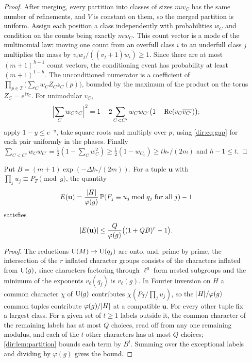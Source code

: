 \begin{proof}
After merging, every partition into classes of sizes $mw_C$ has the same number of refinements,
and $V$ is constant on them, so the merged partition is uniform. Assign each position a class
independently with probabilities $w_C$ and condition on the counts being exactly $mw_C$. This
count vector is a mode of the multinomial law: moving one count from an overfull class $i$ to
an underfull class $j$ multiplies the mass by $v_iw_j/((v_j+1)w_i)\ge1$. Since there are at most
$(m+1)^{h-1}$ count vectors, the conditioning event has probability at least $(m+1)^{1-h}$. The
unconditioned numerator is a coefficient of $\prod_{p\in T}\bigl(\sum_Cw_CZ_Cz_C(p)\bigr)$, bounded
by the maximum of the product on the torus $Z_C=e^{i\tau_C}$. For unimodular $v_C$,
\[
 \Bigl|\sum_Cw_Cv_C\Bigr|^2=1-2\sum_{C<C'}w_Cw_{C'}\bigl(1-\Re(v_C\overline{v_{C'}})\bigr);
\]
apply $1-y\le e^{-y}$, take square roots and multiply over $p$, using \eqref{dir:eq:gap} for each
pair uniformly in the phases. Finally
$\sum_{C<C'}w_Cw_{C'}=\frac12(1-\sum_Cw_C^2)\ge\frac12(1-w_{C_0})\ge tk_*/(2m)$ and $h-1\le t$.
\end{proof}

\begin{proposition}\label{dir:prop:mixed}
Put $B=(m+1)\exp(-\Delta k_*/(2m))$. For a tuple $\mathbf u$ with $\prod_ju_j\equiv P_T\pmod g$,
the quantity
\[
 E(\mathbf u)=\frac{\abs H}{\varphi(g)}\,\dirP(F_j\equiv u_j\bmod q_j\text{ for all }j)-1
\]
satisfies
\[
 \abs{E(\mathbf u)}\le\frac Q{\varphi(g)}\bigl((1+QB)^r-1\bigr).
\]
\end{proposition}

\begin{proof}
The reductions $\dirU(M)\to\dirU(q_j)$ are onto, and, prime by prime, the intersection of the $r$
inflated character groups consists of the characters inflated from $\dirU(g)$, since characters
factoring through $\ell^a$ form nested subgroups and the minimum of the exponents
$v_\ell(q_j)$ is $v_\ell(g)$. In Fourier inversion on $H$ a common character $\chi$ of $\dirU(g)$
contributes $\chi(P_T/\prod_ju_j)$, so the $\abs H/\varphi(g)$ common tuples contribute
$\varphi(g)/\abs H$ at a compatible $\mathbf u$. For every other tuple fix a largest class. For a
given set of $t\ge1$ labels outside it, the common character of the remaining labels has at most
$Q$ choices, read off from any one remaining modulus, and each of the $t$ other characters has at
most $Q$ choices; \cref{dir:lem:partition} bounds each term by $B^t$. Summing over the
exceptional labels and dividing by $\varphi(g)$ gives the bound.
\end{proof}

